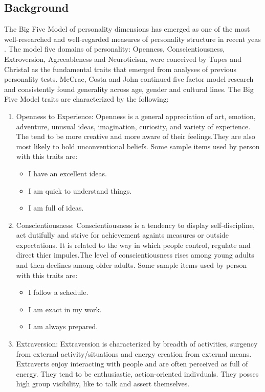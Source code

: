 \subsection{Background}
The Big Five Model of personality dimensions has emerged as one of the most well-researched and well-regarded measures of personality structure in recent yeas \cite{fivefactormodel}. The model five domains of personality: Openness, Conscientiousness, Extroversion, Agreeableness and Neuroticism, were conceived by Tupes and Christal \cite{tupes} as the fundamental traits that emerged from analyses of previous personality tests. McCrae, Costa and John \cite{mccrae} continued five factor model research and consistently found generality across age, gender and cultural lines.
The Big Five Model traits are characterized by the following:
\begin{enumerate}
	\item Openness to Experience: Openness is a general appreciation of art, emotion, adventure, unusual ideas, imagination, curiosity, and variety of experience. The tend to be more creative and more aware of their feelings.They are also most likely to hold unconventional beliefs.
Some sample items used by person with this traits are:
\begin{itemize}
	\item I have an excellent ideas.
	\item I am quick to understand things.
	\item I am full of ideas.
\end{itemize}
\item Conscientiousness: Conscientiousness is a tendency to display self-discipline, act dutifully and strive for achievement againts measures or outside expectations. It is related to the way in which people control, regulate and direct thier impules.The level of conscientiousness rises among young adults and then declines among older adults.
Some sample items used by person with this traits are:
\begin{itemize}
	\item I follow a schedule.
	\item I am exact in my work.
	\item I am always prepared.
\end{itemize}
\item Extraversion: Extraversion is characterized by breadth of activities, surgency from external activity/situations and energy creation from external means. Extraverts enjoy interacting with people and are often perceived as full of energy. They tend to be enthusiastic, action-oriented indivduals. They posses high group visibility, like to talk and assert themselves.

\end{enumerate}
